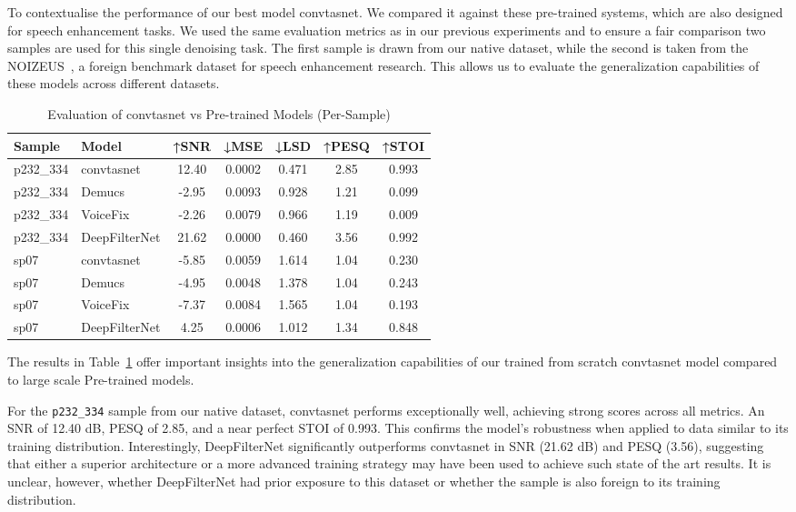 To contextualise the performance of our best model \gls{convtasnet}. We compared it against these pre-trained systems, which are also designed for speech enhancement tasks. We used the same evaluation metrics as in our previous experiments and to ensure a fair comparison two samples are used for this single denoising task. The first sample is drawn from our native dataset, while the second is taken from the NOIZEUS~\cite{hu2007subjective}, a foreign benchmark dataset for speech enhancement research. This allows us to evaluate the generalization capabilities of these models across different datasets.

\vspace{1em}
\begin{table}[H]
\centering
\caption{Evaluation of \gls{convtasnet} vs Pre-trained Models (Per-Sample)}
\label{tab:pretrained_eval}
\begin{tabular}{|l|l|c|c|c|c|c|}
\hline
\textbf{Sample} & \textbf{Model} & \textbf{↑SNR} & \textbf{↓MSE} & \textbf{↓LSD} & \textbf{↑PESQ} & \textbf{↑STOI} \\
\hline
p232\_334 & \gls{convtasnet}      & 12.40 & 0.0002 & 0.471 & 2.85 & 0.993 \\
p232\_334 & Demucs          & -2.95 & 0.0093 & 0.928 & 1.21 & 0.099 \\
p232\_334 & VoiceFix        & -2.26 & 0.0079 & 0.966 & 1.19 & 0.009 \\
p232\_334 & DeepFilterNet   & 21.62 & 0.0000 & 0.460 & 3.56 & 0.992 \\
\hline
sp07      & \gls{convtasnet}      & -5.85 & 0.0059 & 1.614 & 1.04 & 0.230 \\
sp07      & Demucs          & -4.95 & 0.0048 & 1.378 & 1.04 & 0.243 \\
sp07      & VoiceFix        & -7.37 & 0.0084 & 1.565 & 1.04 & 0.193 \\
sp07      & DeepFilterNet   & 4.25  & 0.0006 & 1.012 & 1.34 & 0.848 \\
\hline
\end{tabular}
\end{table}


The results in Table~\ref{tab:pretrained_eval} offer important insights into the generalization capabilities of our trained from scratch \gls{convtasnet} model compared to large scale Pre-trained models.

For the \texttt{p232\_334} sample from our native dataset, \gls{convtasnet} performs exceptionally well, achieving strong scores across all metrics. An SNR of 12.40 dB, PESQ of 2.85, and a near perfect STOI of 0.993. This confirms the model’s robustness when applied to data similar to its training distribution. Interestingly, DeepFilterNet significantly outperforms \gls{convtasnet} in SNR (21.62 dB) and PESQ (3.56), suggesting that either a superior architecture or a more advanced training strategy may have been used to achieve such state of the art results. It is unclear, however, whether DeepFilterNet had prior exposure to this dataset or whether the sample is also foreign to its training distribution.

